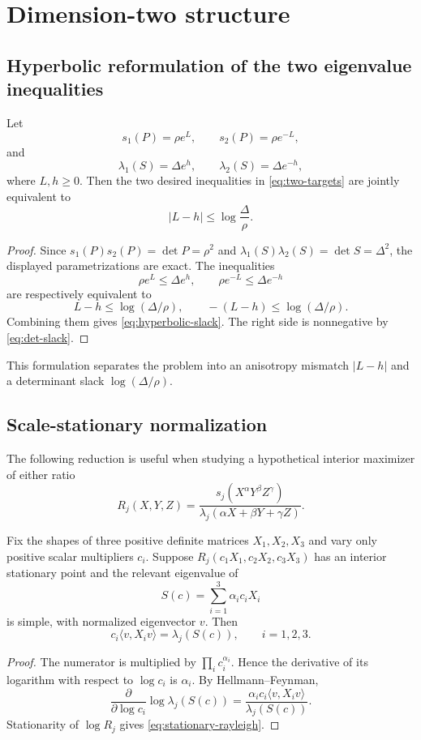 \section{Dimension-two structure}

\subsection{Hyperbolic reformulation of the two eigenvalue inequalities}
\begin{proposition}
Let
\[
s_1(P)=\rho e^L,\qquad s_2(P)=\rho e^{-L},
\]
and
\[
\lambda_1(S)=\Delta e^h,\qquad \lambda_2(S)=\Delta e^{-h},
\]
where $L,h\ge0$.  Then the two desired inequalities in \eqref{eq:two-targets} are jointly equivalent to
\begin{equation}
\boxed{
|L-h|\le \log\frac{\Delta}{\rho}.
}
\label{eq:hyperbolic-slack}
\end{equation}
\end{proposition}
\begin{proof}
Since $s_1(P)s_2(P)=\det P=\rho^2$ and $\lambda_1(S)\lambda_2(S)=\det S=\Delta^2$, the displayed parametrizations are exact.  The inequalities
\[
\rho e^L\le \Delta e^h,
\qquad
\rho e^{-L}\le \Delta e^{-h}
\]
are respectively equivalent to
\[
L-h\le\log(\Delta/\rho),
\qquad
-(L-h)\le\log(\Delta/\rho).
\]
Combining them gives \eqref{eq:hyperbolic-slack}.  The right side is nonnegative by \eqref{eq:det-slack}.
\end{proof}

This formulation separates the problem into an anisotropy mismatch $|L-h|$ and a determinant slack $\log(\Delta/\rho)$.

\subsection{Scale-stationary normalization}
The following reduction is useful when studying a hypothetical interior maximizer of either ratio
\[
R_j(X,Y,Z)=\frac{s_j(X^\alpha Y^\beta Z^\gamma)}{\lambda_j(\alpha X+\beta Y+\gamma Z)}.
\]

\begin{lemma}\label{lem:stationary-scaling}
Fix the shapes of three positive definite matrices $X_1,X_2,X_3$ and vary only positive scalar multipliers $c_i$.  Suppose $R_j(c_1X_1,c_2X_2,c_3X_3)$ has an interior stationary point and the relevant eigenvalue of
\[
S(c)=\sum_{i=1}^3\alpha_i c_iX_i
\]
is simple, with normalized eigenvector $v$.  Then
\begin{equation}
 c_i\langle v,X_iv\rangle=\lambda_j(S(c)),\qquad i=1,2,3.
\label{eq:stationary-rayleigh}
\end{equation}
\end{lemma}
\begin{proof}
The numerator is multiplied by $\prod_i c_i^{\alpha_i}$.  Hence the derivative of its logarithm with respect to $\log c_i$ is $\alpha_i$.  By Hellmann--Feynman,
\[
\frac{\partial}{\partial\log c_i}\log\lambda_j(S(c))
=\frac{\alpha_i c_i\langle v,X_iv\rangle}{\lambda_j(S(c))}.
\]
Stationarity of $\log R_j$ gives \eqref{eq:stationary-rayleigh}.
\end{proof}

